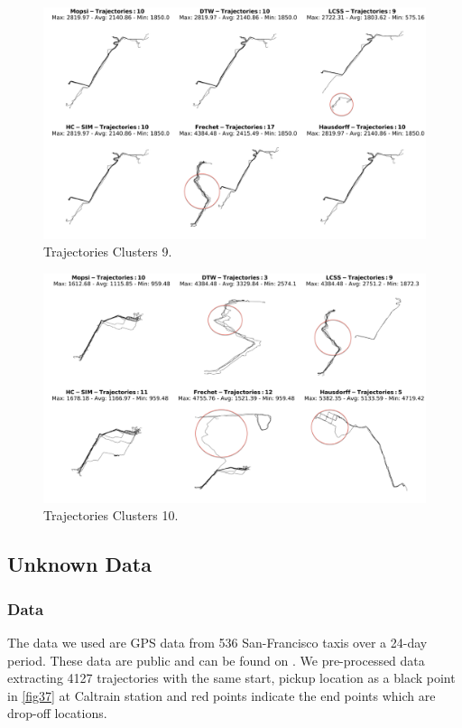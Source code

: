 \documentclass[a4paper, 12pt]{article}
\begin{document}
\begin{figure}[htbp!]
    \centering
    \includegraphics[width=1\textwidth]{Mopsi Clusters 9.png}
    \caption{Trajectories Clusters 9.}
    \label{fig35}
\end{figure}

\begin{figure}[htbp!]
    \centering
    \includegraphics[width=1\textwidth]{Mopsi Clusters 10.png}
    \caption{Trajectories Clusters 10.}
    \label{fig36}
\end{figure}

\pagebreak

\subsection{Unknown Data}

\subsubsection{Data}
The data we used are GPS data from 536 San-Francisco taxis over a 24-day period. These data are public and can be found on \citet{piorkowski2009crawdad}. We pre-processed data extracting 4127 trajectories with the same start, pickup location as a black point in \autoref{fig37} at Caltrain station and red points indicate the end points which are drop-off locations.
\end{document}
